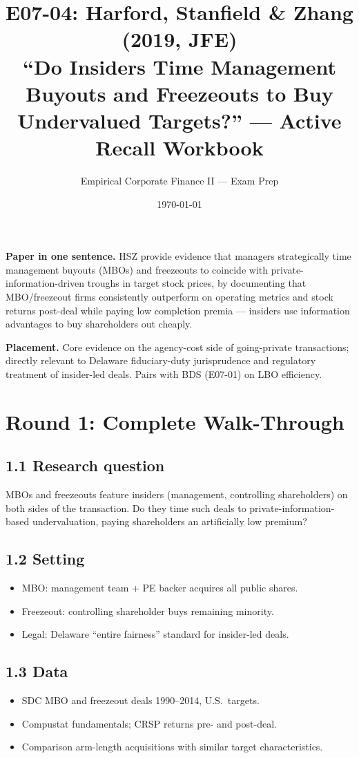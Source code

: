 \documentclass[11pt]{article}
\title{E07-04: Harford, Stanfield \& Zhang (2019, JFE) \\
\large ``Do Insiders Time Management Buyouts and Freezeouts to Buy Undervalued Targets?'' --- Active Recall Workbook}
\author{Empirical Corporate Finance II --- Exam Prep}
\date{\today}
\begin{document}
\maketitle

\begin{keybox}
\textbf{Paper in one sentence.} HSZ provide evidence that managers strategically time management buyouts (MBOs) and freezeouts to coincide with private-information-driven troughs in target stock prices, by documenting that MBO/freezeout firms consistently outperform on operating metrics and stock returns post-deal while paying low completion premia --- insiders use information advantages to buy shareholders out cheaply.

\textbf{Placement.} Core evidence on the agency-cost side of going-private transactions; directly relevant to Delaware fiduciary-duty jurisprudence and regulatory treatment of insider-led deals. Pairs with BDS (E07-01) on LBO efficiency.
\end{keybox}

\section*{Round 1: Complete Walk-Through}

\subsection*{1.1 Research question}
MBOs and freezeouts feature insiders (management, controlling shareholders) on both sides of the transaction. Do they time such deals to private-information-based undervaluation, paying shareholders an artificially low premium?

\subsection*{1.2 Setting}
\begin{itemize}
\item MBO: management team + PE backer acquires all public shares.
\item Freezeout: controlling shareholder buys remaining minority.
\item Legal: Delaware ``entire fairness'' standard for insider-led deals.
\end{itemize}

\subsection*{1.3 Data}
\begin{itemize}
\item SDC MBO and freezeout deals 1990--2014, U.S.\ targets.
\item Compustat fundamentals; CRSP returns pre- and post-deal.
\item Comparison arm-length acquisitions with similar target characteristics.
\end{itemize}
\end{document}
